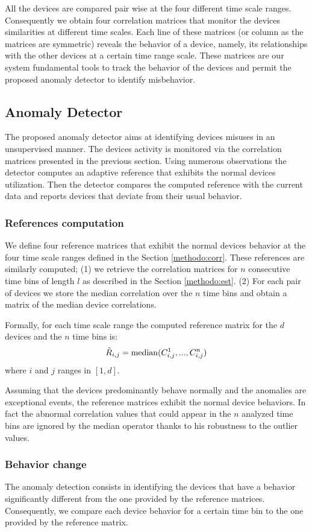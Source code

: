 All the devices are compared pair wise at the four different time scale ranges.
Consequently we obtain four correlation matrices that monitor the devices similarities at different time scales.
Each line of these matrices (or column as the matrices are symmetric) reveals the behavior of a device, namely, its relationships with the other devices at a certain time range scale.
These matrices are our system fundamental tools to track the behavior of the devices and permit the proposed anomaly detector to identify misbehavior.


\subsection{Anomaly Detector}\label{methodo:ano}
The proposed anomaly detector aims at identifying devices misuses in an unsupervised manner.
The devices activity is monitored via the correlation matrices presented in the previous section.
Using numerous observations the detector computes an adaptive reference that exhibits the normal devices utilization.
Then the detector compares the computed reference with the current data and reports devices that deviate from their usual behavior.

\subsubsection{References computation}
We define four reference matrices that exhibit the normal devices behavior at the four time scale ranges defined in the Section \ref{methodo:corr}.
These references are similarly computed; (1) we retrieve the correlation matrices for $n$ consecutive time bins of length $l$ as described in the Section \ref{methodo:est}. (2) For each pair of devices we store the median correlation over the $n$ time bins and obtain a matrix of the median device correlations.

Formally, for each time scale range the computed reference matrix for the $d$ devices and the $n$ time bins is:
\[\tilde{R}_{i,j} =  \operatorname{median}(C^1_{i,j},...,C^n_{i,j})\]
where $i$ and $j$ ranges in $[1,d]$.

Assuming that the devices predominantly behave normally and the anomalies are exceptional events, the reference matrices exhibit the normal device behaviors.
In fact the abnormal correlation values that could appear in the $n$ analyzed time bins are ignored by the median operator thanks to his robustness to the outlier values.

\subsubsection{Behavior change}
The anomaly detection consists in identifying the devices that have a behavior significantly different from the one provided by the reference matrices.
Consequently, we compare each device behavior for a certain time bin to the one provided by the reference matrix.


